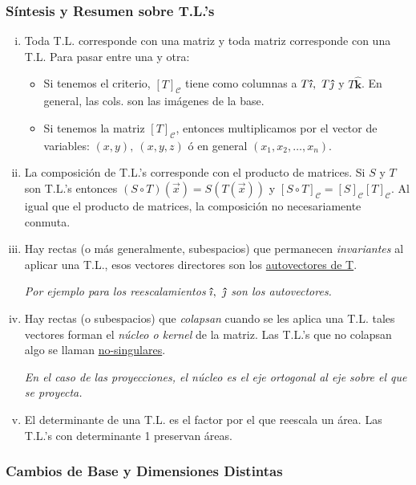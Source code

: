 \documentclass[12pt]{article}
\theoremstyle{plain}
\theoremstyle{definition}
\theoremstyle{remark}
\newcommand{\thickhat}[1]{\mathbf{\hat{\text{$#1$}}}}
\newcommand{\ii}{\vu{\imath}}
\newcommand{\jj}{\vu{\jmath}}
\newcommand{\kk}{\thickhat{k}}
\newcommand{\cC}{\mathcal{C}}       %
\renewcommand{\:}{\colon}           %
\newcommand{\un}[1]{\underline{#1}}
\renewcommand{\.}{\Cdot}                %
\begin{document}
\begin{multicols}{2}

\subsubsection*{Síntesis y Resumen sobre T.L.'s}

\begin{enumerate}[i)]
    \itemsep=-0.5em
    \item Toda T.L. corresponde con una matriz y toda matriz corresponde con una T.L. Para pasar entre una y otra:\vspace{-1em}\begin{itemize}
        \itemsep=-0.42em 
        \item Si tenemos el criterio, $[T]_\cC$ tiene como columnas a $T\ii,\ T\jj$ y $T\kk$. En general, las cols. son las imágenes de la base.
        \item Si tenemos la matriz $[T]_\cC$, entonces multiplicamos por el vector de variables: $(x,y),\ (x,y,z)$ ó en general $(x_1,x_2,\dots,x_n)$.
    \end{itemize}
    \item La composición de T.L.'s corresponde con el producto de matrices. Si $S$ y $T$ son T.L.'s entonces $(S\circ T)(\vec{x})=S(T(\vec{x}))$ y $[S\circ T]_\cC=[S]_\cC[T]_\cC$. Al igual que el producto de matrices, la composición no necesariamente conmuta.
    \item Hay rectas (o más generalmente, subespacios) que permanecen \emph{invariantes} al aplicar una T.L., esos vectores directores son los \un{autovectores de T}.\par 
    \emph{Por ejemplo para los reescalamientos} $\ii,\ \jj$ \emph{son los autovectores.}\vspace{0.5em}
    \item Hay rectas (o subespacios) que \emph{colapsan} cuando se les aplica una T.L. tales vectores forman el \emph{núcleo o kernel} de la matriz. Las T.L.'s que no colapsan algo se llaman \un{no-singulares}.\par 
    \emph{En el caso de las proyecciones, el núcleo es el eje ortogonal al eje sobre el que se proyecta.}\vspace{0.5em}
    \item El determinante de una T.L. es el factor por el que reescala un área. Las T.L.'s con determinante 1 preservan áreas.
\end{enumerate}


\subsubsection*{Cambios de Base y Dimensiones Distintas}


\end{multicols}
\end{document}
